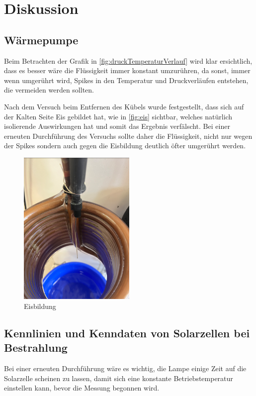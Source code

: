 \documentclass[12pt,english,ngerman]{scrartcl}
\begin{document}
\section{Diskussion}\label{sec:diskussion}

\subsection{Wärmepumpe}

Beim Betrachten der Grafik in \autoref{fig:druckTemperaturVerlauf} wird klar
ersichtlich, dass es besser wäre die Flüssigkeit immer konstant umzurühren, da
sonst, immer wenn umgerührt wird, Spikes in den Temperatur und Druckverläufen
entstehen, die vermeiden werden sollten.

Nach dem Versuch beim Entfernen des Kübels wurde festgestellt, dass sich auf
der Kalten Seite Eis gebildet hat, wie in \autoref{fig:eis} sichtbar, welches
natürlich isolierende Auswirkungen hat und somit das Ergebnis verfälscht. Bei
einer erneuten Durchführung des Versuchs sollte daher die Flüssigkeit, nicht
nur wegen der Spikes sondern auch gegen die Eisbildung deutlich öfter umgerührt
werden.

\begin{figure}[H]
	\centering
	\includegraphics[width=0.5\textwidth]{figures/eis.PNG}
	\caption{Eisbildung
	}\label{fig:eis}
\end{figure}

\subsection{Kennlinien und Kenndaten von Solarzellen bei Bestrahlung}

Bei einer erneuten Durchführung wäre es wichtig, die Lampe einige Zeit auf die
Solarzelle scheinen zu lassen, damit sich eine konstante Betriebstemperatur
einstellen kann, bevor die Messung begonnen wird.
\end{document}
